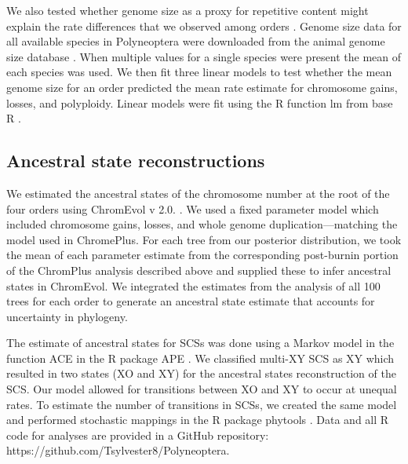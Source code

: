 We also tested whether genome size as a proxy for repetitive content might explain the rate differences that we observed among orders \citep{kidwell2002transposable,bennetzen2005mechanisms}.
Genome size data for all available species in Polyneoptera were downloaded from the animal genome size database \citep{gregory2019}.
When multiple values for a single species were present the mean of each species was used.
We then fit three linear models to test whether the mean genome size for an order predicted the mean rate estimate for chromosome gains, losses, and polyploidy. 
Linear models were fit using the R function lm from base R \citep{R-citation}.

\subsection{Ancestral state reconstructions}
We estimated the ancestral states of the chromosome number at the root of the four orders using ChromEvol v 2.0. \citep{glick2014chromevol, mayrose2009chromevol}.
We used a fixed parameter model which included chromosome gains, losses, and whole genome duplication---matching the model used in ChromePlus.
For each tree from our posterior distribution, we took the mean of each parameter estimate from the corresponding post-burnin portion of the ChromPlus analysis described above and supplied these to infer ancestral states in ChromEvol.
We integrated the estimates from the analysis of all 100 trees for each order to generate an ancestral state estimate that accounts for uncertainty in phylogeny. 

The estimate of ancestral states for SCSs was done using a Markov model in the function ACE in the R package APE \citep{Paradis2018}.
We classified multi-XY SCS as XY which resulted in two states (XO and XY) for the ancestral states reconstruction of the SCS. 
Our model allowed for transitions between XO and XY to occur at unequal rates.
To estimate the number of transitions in SCSs, we created the same model and performed stochastic mappings in the R package phytools \citep{revell2012phytools}.
Data and all R code for analyses are provided in a GitHub repository: https://github.com/Tsylvester8/Polyneoptera. 